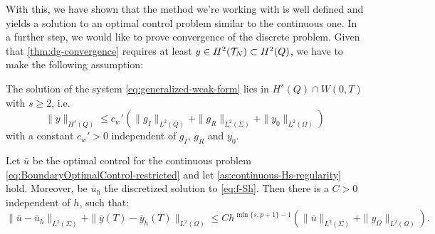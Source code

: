 \documentclass[../thesis.tex]{subfiles}
\begin{document}
With this, we have shown that the method we're working with is well defined and yields a solution to an optimal control problem similar to the continuous one.
In a further step, we would like to prove convergence of the discrete problem.
Given that \cref{thm:dg-convergence} requires at least $y \in H^2(\mathcal{T}_N) \subset H^2(Q)$, we have to make the following assumption:
\begin{assumption}
\label{as:continuous-Hs-regularity}
The solution of the system \cref{eq:generalized-weak-form} lies in $H^s(Q) \cap W(0,T)$ with $s \geq 2$, i.e.
\[
	\| y \|_{H^s(Q)} \leq c_w' \left( \| g_I \|_{L^2(Q)} + \| g_R \|_{L^2(\Sigma)} + \| y_0 \|_{L^2(\Omega)} \right)
\]
with a constant $c_w' > 0$ independent of $g_I$, $g_R$ and $y_0$.
\end{assumption}
\begin{theorem}
\label{thm:optimal-control-convergence}
Let $\bar{u}$ be the optimal control for the continuous problem \cref{eq:BoundaryOptimalControl-restricted} and let \cref{as:continuous-Hs-regularity} hold. Moreover, be $\bar{u}_h$ the discretized solution to \cref{eq:f-Sh}.
Then there is a $C > 0$ independent of $h$, such that:
\[
	\| \bar{u} - \bar{u}_h \|_{L^2(\Sigma)} + \| \bar{y}(T) - \bar{y}_h(T) \|_{L^2(\Omega)} \leq C h^{\min \{ s, p+1\} - 1} \left( \| \bar{u} \|_{L^2(\Sigma)} + \| y_\Omega \|_{L^2(\Omega)} \right).
\]
\end{theorem}
\end{document}
